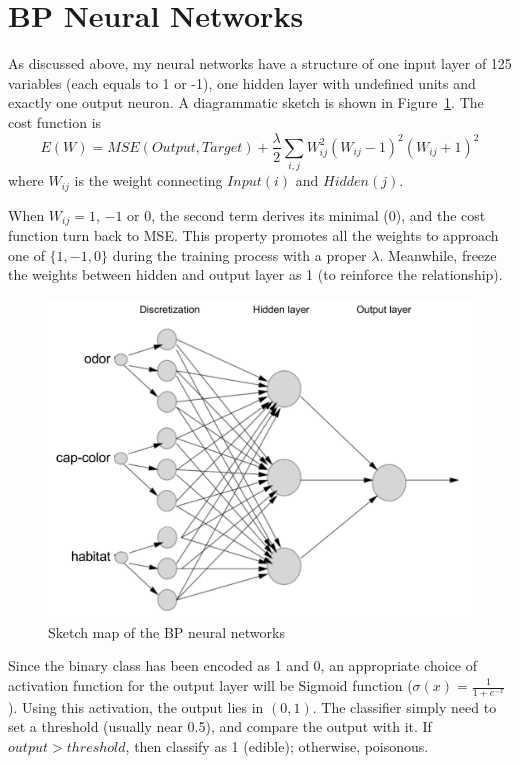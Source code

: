 \documentclass[runningheads]{llncs}
\newcommand*{\term}{\frac{\lambda}{2}\sum_{i, j}W_{ij}^2(W_{ij}-1)^2(W_{ij}+1)^2}
\begin{document}
\section{BP Neural Networks}
\label{sec-bp}
As discussed above, my neural networks have a structure of one input layer of 125 variables (each equals to 1 or -1), one hidden layer with undefined units and exactly one output neuron. A diagrammatic sketch is shown in Figure~\ref{fig-bp}. The cost function is
\begin{equation}
	E(W) = MSE(Output, Target) + \term
\end{equation}
where $W_{ij}$ is the weight connecting $Input(i)$ and $Hidden(j)$.

When $W_{ij} = 1$, $-1$ or $0$, the second term derives its minimal (0), and the cost function turn back to MSE. This property promotes all the weights to approach one of $\{1, -1, 0\}$ during the training process with a proper $\lambda$. Meanwhile, freeze the weights between hidden and output layer as 1 (to reinforce the relationship).

\begin{figure}[htbp]
	\centering
	\includegraphics[scale=0.5]{bpNN}
	\caption{Sketch map of the BP neural networks}
	\label{fig-bp}
\end{figure}

Since the binary class has been encoded as 1 and 0, an appropriate choice of activation function for the output layer will be Sigmoid function ($\sigma(x) = \frac{1}{1+e^{-x}}$). Using this activation, the output lies in $(0,1)$. The classifier simply need to set a threshold (usually near 0.5), and compare the output with it. If $output > threshold$, then classify as 1 (edible); otherwise, poisonous.
\end{document}
